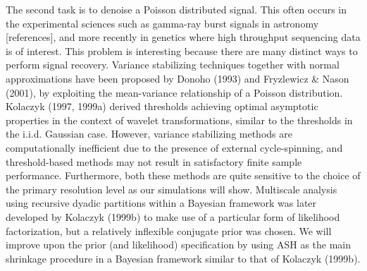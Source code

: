 \documentclass[12pt]{article}
\begin{document}
The second task is to denoise a Poisson distributed signal. This often occurs in the experimental sciences such as gamma-ray burst signals in astronomy [references], and more recently in genetics where high throughput sequencing data is of interest. This problem is interesting because there are many distinct ways to perform signal recovery. Variance stabilizing techniques together with normal approximations have been proposed by Donoho (1993) and Fryzlewicz \& Nason (2001), by exploiting the mean-variance relationship of a Poisson distribution. Kolaczyk (1997, 1999a) derived thresholds achieving optimal asymptotic properties in the context of wavelet transformations, similar to the thresholds in the i.i.d. Gaussian case.  However, variance stabilizing methods are computationally inefficient due to the presence of external cycle-spinning, and threshold-based methods may not result in satisfactory finite sample performance. Furthermore, both these methods are quite sensitive to the choice of the primary resolution level as our simulations will show. Multiscale analysis using recursive dyadic partitions within a Bayesian framework was later developed by Kolaczyk (1999b) to make use of a particular form of likelihood factorization, but a relatively inflexible conjugate prior was chosen. We will improve upon the prior (and likelihood) specification by using ASH as the main shrinkage procedure in a Bayesian framework similar to that of Kolaczyk (1999b).

\end{document}

